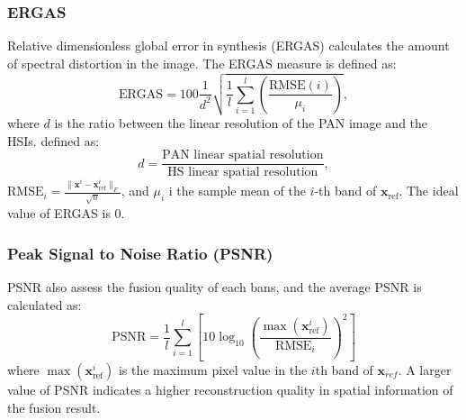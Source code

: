 \documentclass[journal]{IEEEtran}
\begin{document}
\subsubsection{ERGAS} Relative dimensionless global error in synthesis (ERGAS) calculates the amount of spectral distortion in the image. The ERGAS measure is defined as:
    \begin{equation}
        \text{ERGAS} = 100 \frac{1}{d^2} \sqrt{\frac{1}{l} \sum_{i=1}^{l} \left( \frac{\text{RMSE}(i)}{\mu_i} \right)  },
    \end{equation}
    where $d$ is the ratio between the linear resolution of the PAN image and the HSIs. defined as:
    \begin{equation}
        d = \frac{\text{PAN linear spatial resolution}}{\text{HS linear spatial resolution}},
    \end{equation}
    $\text{RMSE}_i = \frac{\lVert \mathbf{x}^i - \mathbf{x}_{\text{ref}}^i \rVert_F}{\sqrt{n}}$, and $ \mu_i$ i the sample mean of the $i$-th band of $\mathbf{x}_{\text{ref}}$. The ideal value of ERGAS is 0.
    
\subsubsection{Peak Signal to Noise Ratio (PSNR)} PSNR also assess the fusion quality of each bans, and the average PSNR is calculated as:
    \begin{equation}
        \text{PSNR} = \frac{1}{l} \sum_{i=1}^{l} \left[ 10 \log_{10} \left(  \frac{\max \left( \mathbf{x}_{\text{ref}}^i \right)}{\text{RMSE}_i}  \right)^2 \right]
    \end{equation}
    where $\max \left( \mathbf{x}_{\text{ref}}^i \right)$ is the maximum pixel value in the $i$th band of $\mathbf{x}_{ref}$. A larger value of PSNR indicates a higher reconstruction quality in spatial information of the fusion result.
\end{document}
